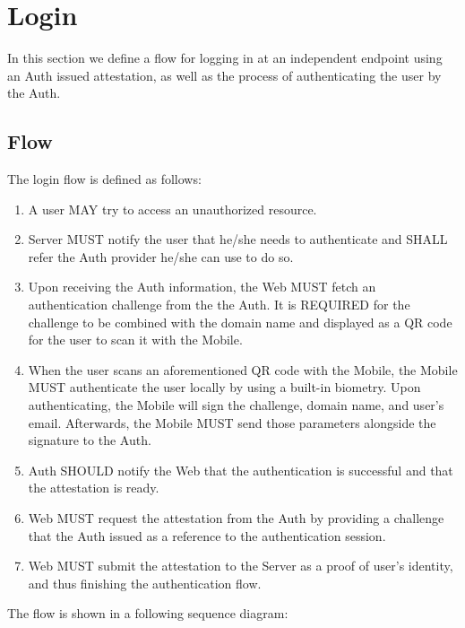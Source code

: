 \section{Login}
In this section we define a flow for logging in at an independent endpoint using an Auth
issued attestation, as well as the process of authenticating the user by the Auth. 

    \subsection{Flow}
    The login flow is defined as follows:
        \begin{enumerate}
            \item A user MAY try to access an unauthorized resource.
            \item Server MUST notify the user that he/she needs to authenticate and SHALL refer the Auth provider 
                  he/she can use to do so.
            \item Upon receiving the Auth information, the Web MUST fetch an authentication challenge from the
                  the Auth. It is REQUIRED for the challenge to be combined with the domain name and displayed
                  as a QR code for the user to scan it with the Mobile.
            \item When the user scans an aforementioned QR code with the Mobile, the Mobile MUST authenticate the 
                  user locally by using a built-in biometry. Upon authenticating, the Mobile will sign the 
                  challenge, domain name, and user's email. Afterwards, the Mobile MUST send those parameters 
                  alongside the signature to the Auth.
            \item Auth SHOULD notify the Web that the authentication is successful and that the attestation is ready.
            \item Web MUST request the attestation from the Auth by providing a challenge that the Auth issued as a 
                  reference to the authentication session.
            \item Web MUST submit the attestation to the Server as a proof of user's identity, and thus finishing the
                  authentication flow.
        \end{enumerate}

    The flow is shown in a following sequence diagram: 
        
    
